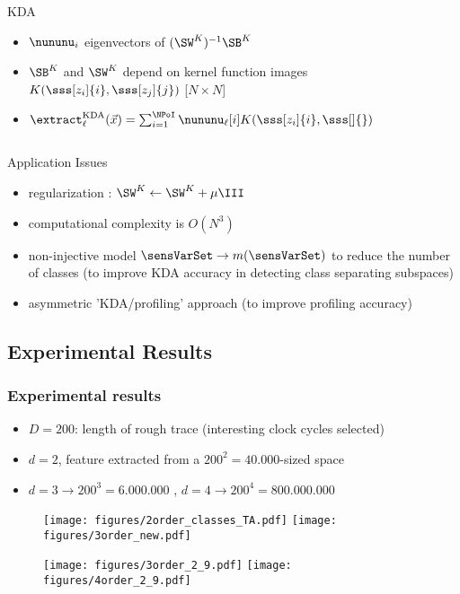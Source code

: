 \begin{frame}
\begin{columns}
\begin{column}{.5\textwidth}
\begin{block}{KDA}
\begin{itemize}
\item $\nununu_i$ eigenvectors of $(\SW^K)^{-1}\SB^K$
\item $\SB^K$ and $\SW^K$ depend on kernel function images $K(\sss[z_i]{i}, \sss[z_j]{j})$ [$N\times N$]
\item $\extract^{\mathrm{KDA}}_{\ell}(\vec{x}) = \sum_{i=1}^{\NPoI}\nununu_\ell[i]K(\sss[z_i]{i}, \sss[]{}) $
\end{itemize}
\end{block}
\end{column}
\end{columns}
\vspace{-5pt}
\begin{block}{Application Issues}
\begin{itemize}
\item regularization : $\SW^K \leftarrow \SW^K + \mu \III$
\item computational complexity is $O(N^3)$ 
\item non-injective model $\sensVarSet \rightarrow m(\sensVarSet)$ to reduce the number of classes (to improve KDA accuracy in detecting class separating subspaces)
\item asymmetric 'KDA/profiling' approach (to improve profiling accuracy)
\end{itemize}
\end{block}

\end{frame}

\subsection{Experimental Results}


\begin{frame}
\frametitle{Experimental results}
\begin{itemize}
\item $D = 200$: length of rough trace (interesting clock cycles selected)
\item $d=2$, feature extracted from a $200^2 = 40.000$-sized space
\item $d=3 \rightarrow 200^3=6.000.000$ , $d=4 \rightarrow 200^4 = 800.000.000$
\end{itemize}
\begin{figure}[t]

\texttt{[image: figures/2order\_classes\_TA.pdf]}
\texttt{[image: figures/3order\_new.pdf]}
\end{figure}
\vspace{-10pt}
\begin{figure}[t]

\texttt{[image: figures/3order\_2\_9.pdf]}
\texttt{[image: figures/4order\_2\_9.pdf]}
\end{figure}
\end{frame}